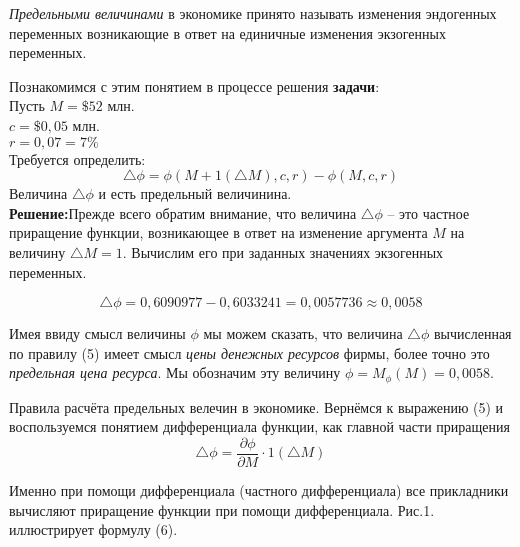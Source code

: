 \documentclass[12pt,a4paper]{article}
\begin{document}
\textit{Предельными величинами} в экономике принято называть изменения эндогенных переменных возникающие в ответ на единичные изменения экзогенных переменных. 

Познакомимся с этим понятием в процессе решения \textbf{задачи}:\\
Пусть $M = \$52$ млн.\\
$c = \$ 0,05$ млн. \\
$r = 0,07 = 7\%$\\
Требуется определить: \\
\begin{equation}
\triangle \phi = \phi(M+1(\triangle M), c, r) - \phi(M,c,r)
\end{equation}
Величина $\triangle \phi$ и есть предельный величинина.\\
\textbf{Решение:}Прежде всего обратим внимание, что величина $\triangle \phi$ -- это частное приращение функции, возникающее в ответ на изменение аргумента $M$ на величину $\triangle M = 1$. Вычислим его при заданных значениях экзогенных переменных.

$$\triangle \phi = 0,6090977 - 0,6033241 = 0,0057736 \approx 0,0058$$

Имея ввиду смысл величины $\phi$ мы можем сказать, что величина $\triangle \phi$ вычисленная по правилу (5) имеет смысл \textit{цены денежных ресурсов} фирмы, более точно это \textit{предельная цена ресурса}. Мы обозначим эту величину $\phi = M_{\phi}(M) = 0,0058$. 

Правила расчёта предельных велечин в экономике. Вернёмся к выражению (5) и воспользуемся понятием дифференциала функции, как главной части приращения 
\begin{equation}
\triangle \phi = \frac{\partial \phi}{\partial M} \cdot 1(\triangle M)
\end{equation}

Именно при помощи дифференциала (частного дифференциала) все прикладники вычисляют приращение функции при помощи дифференциала. Рис.1. иллюстрирует формулу (6). 

\end{document}
